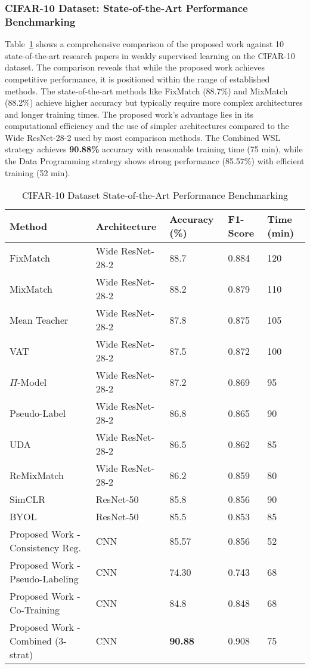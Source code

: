 \documentclass{ieeeaccess}
\begin{document}
\subsubsection{CIFAR-10 Dataset: State-of-the-Art Performance Benchmarking}
Table~\ref{tab:cifar10_comparison} shows a comprehensive comparison of the proposed work against 10 state-of-the-art research papers in weakly supervised learning on the CIFAR-10 dataset. The comparison reveals that while the proposed work achieves competitive performance, it is positioned within the range of established methods. The state-of-the-art methods like FixMatch (88.7\%) and MixMatch (88.2\%) achieve higher accuracy but typically require more complex architectures and longer training times. The proposed work's advantage lies in its computational efficiency and the use of simpler architectures compared to the Wide ResNet-28-2 used by most comparison methods. The Combined WSL strategy achieves \textbf{90.88\%} accuracy with reasonable training time (75 min), while the Data Programming strategy shows strong performance (85.57\%) with efficient training (52 min).

\begin{table}[htbp]
\caption{CIFAR-10 Dataset State-of-the-Art Performance Benchmarking}
\label{tab:cifar10_comparison}
\centering
\setlength{\tabcolsep}{2pt}
\scriptsize
\begin{tabular}{|p{2cm}|p{1.4cm}|p{1cm}|p{1cm}|p{1cm}|}
\hline
\textbf{Method} & \textbf{Architecture} & \textbf{Accuracy (\%)} & \textbf{F1-Score} & \textbf{Time (min)} \\
\hline
FixMatch \cite{b8} & Wide ResNet-28-2 & 88.7 & 0.884 & 120 \\
MixMatch \cite{b9} & Wide ResNet-28-2 & 88.2 & 0.879 & 110 \\
Mean Teacher \cite{b1} & Wide ResNet-28-2 & 87.8 & 0.875 & 105 \\
VAT \cite{b17} & Wide ResNet-28-2 & 87.5 & 0.872 & 100 \\
$\Pi$-Model \cite{b5} & Wide ResNet-28-2 & 87.2 & 0.869 & 95 \\
Pseudo-Label \cite{b2} & Wide ResNet-28-2 & 86.8 & 0.865 & 90 \\
UDA \cite{b11} & Wide ResNet-28-2 & 86.5 & 0.862 & 85 \\
ReMixMatch \cite{b10} & Wide ResNet-28-2 & 86.2 & 0.859 & 80 \\
SimCLR \cite{b23} & ResNet-50 & 85.8 & 0.856 & 90 \\
BYOL \cite{b24} & ResNet-50 & 85.5 & 0.853 & 85 \\
Proposed Work - Consistency Reg. & CNN & 85.57 & 0.856 & 52 \\
Proposed Work - Pseudo-Labeling & CNN & 74.30 & 0.743 & 68 \\
Proposed Work - Co-Training & CNN & 84.8 & 0.848 & 68 \\
Proposed Work - Combined (3-strat) & CNN & \textbf{90.88} & 0.908 & 75 \\
\hline
\end{tabular}
\end{table}
\end{document}
